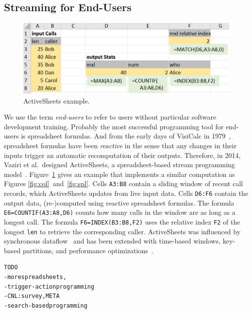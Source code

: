 \subsection{Streaming for End-Users}\label{sec:eup} %

\begin{figure}[!h]
\centerline{\includegraphics[width=\columnwidth]{CallStats.jpg}}
\vspace*{-4mm}
\caption{\label{fig:activesheets}ActiveSheets example.}
\end{figure}

We use the term \emph{end-users} to refer to users without particular
software development training. Probably the most successful
programming tool for end-users is spreadsheet formulas. And from the
early days of VisiCalc in 1979~\cite{bricklin_frankston_1979},
spreadsheet formulas have been \emph{reactive} in the sense that any
changes in their inputs trigger an automatic recomputation of their
outputs. Therefore, in 2014, Vaziri et al.\ designed ActiveSheets, a
spreadsheet-based stream programming model~\cite{vaziri_et_al_2014}.
Figure~\ref{fig:activesheets} gives an example that implements a
similar computation as Figures \mbox{\ref{fig:cql} and \ref{fig:spl}}.
Cells \lstinline{A3:B8} contain a sliding window of recent call
records, which ActiveSheets updates from live input data. Cells
\lstinline{D6:F6} contain the output data, \mbox{(re-)}com\-pu\-ted
using reactive spreadsheet formulas. The formula
\mbox{\lstinline{E6=COUNTIF(A3:A8,D6)}} counts how many calls in the
window are as long as a longest call. The formula
\mbox{\lstinline{F6=INDEX(B3:B8,F2)}} uses the relative index \lstinline{F2}
of the longest \lstinline{len} to retrieve the corresponding
caller.  ActiveSheets was influenced by
synchronous data\-flow~\cite{lustre_1987} and has been extended with
time-based windows, key-based partitions, and performance
optimizations~\cite{hirzel_et_al_2016}.

\begin{alltt}TODO\scriptsize
- more spreadsheets \cite{chang_myers_2015}, \cite{etzion_et_al_2016}
- trigger-action programming~\cite{ifttt}
- CNL: survey \cite{kuhn_2014}, META \cite{arnold_et_al_2016}
- search-based programming \cite{riabov_et_al_2008}
\end{alltt}
